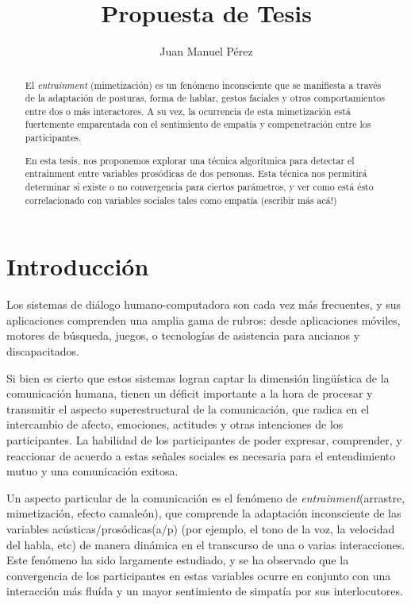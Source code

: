 \documentclass[a4paper,11pt]{article}
\title{Propuesta de Tesis}
\author{Juan Manuel Pérez}
\begin{document}
\maketitle

\begin{abstract}

El \emph{entrainment} (mimetización) es un fenómeno inconsciente que se manifiesta a través de la adaptación de posturas, forma de hablar, gestos faciales y otros comportamientos entre dos o más interactores. A su vez, la ocurrencia de esta mimetización está fuertemente emparentada con el sentimiento de empatía y compenetración entre los participantes.
 
En esta tesis, nos proponemos explorar una técnica algorítmica para detectar el entrainment entre variables prosódicas de dos personas. Esta técnica nos permitirá determinar si existe o no convergencia para ciertos parámetros, y ver como está ésto correlacionado con variables sociales tales como empatía (escribir más acá!)


\end{abstract}


\section{Introducción}

Los sistemas de diálogo humano-computadora son cada vez más frecuentes, y sus aplicaciones comprenden una 
amplia gama de rubros: desde aplicaciones móviles, motores de búsqueda, juegos, o tecnologías de asistencia para 
ancianos y discapacitados.

Si bien es cierto que estos sistemas logran captar la dimensión lingüística de la comunicación humana, tienen un déficit importante a la hora de procesar y transmitir el aspecto superestructural de la comunicación, que radica en el intercambio de afecto, emociones, actitudes y otras intenciones de los participantes. La habilidad de los participantes de poder expresar, comprender, y reaccionar de acuerdo a estas señales sociales es necesaria para el entendimiento mutuo y una comunicación exitosa.
 
Un aspecto particular de la comunicación es el fenómeno de \emph{entrainment}(arrastre, mimetización, efecto camaleón), que comprende la adaptación inconsciente de las variables acústicas/prosódicas(a/p) (por ejemplo, el tono de la voz, la velocidad del habla, etc) de manera dinámica en el transcurso de una o varias interacciones. Este fenómeno ha sido largamente estudiado, y se ha observado que la convergencia de los participantes en estas variables ocurre en conjunto con una interacción más fluída y un mayor sentimiento de simpatía por sus interlocutores.
\end{document}
